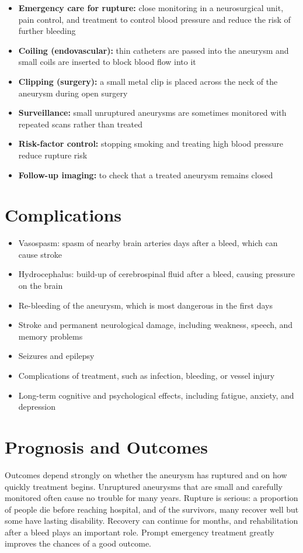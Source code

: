\begin{itemize}
    \item \textbf{Emergency care for rupture:} close monitoring in a neurosurgical unit, pain control, and treatment to control blood pressure and reduce the risk of further bleeding
    \item \textbf{Coiling (endovascular):} thin catheters are passed into the aneurysm and small coils are inserted to block blood flow into it
    \item \textbf{Clipping (surgery):} a small metal clip is placed across the neck of the aneurysm during open surgery
    \item \textbf{Surveillance:} small unruptured aneurysms are sometimes monitored with repeated scans rather than treated
    \item \textbf{Risk-factor control:} stopping smoking and treating high blood pressure reduce rupture risk
    \item \textbf{Follow-up imaging:} to check that a treated aneurysm remains closed
\end{itemize}

\section*{Complications}
\begin{itemize}
    \item Vasospasm: spasm of nearby brain arteries days after a bleed, which can cause stroke
    \item Hydrocephalus: build-up of cerebrospinal fluid after a bleed, causing pressure on the brain
    \item Re-bleeding of the aneurysm, which is most dangerous in the first days
    \item Stroke and permanent neurological damage, including weakness, speech, and memory problems
    \item Seizures and epilepsy
    \item Complications of treatment, such as infection, bleeding, or vessel injury
    \item Long-term cognitive and psychological effects, including fatigue, anxiety, and depression
\end{itemize}

\section*{Prognosis and Outcomes}
Outcomes depend strongly on whether the aneurysm has ruptured and on how quickly treatment begins. Unruptured aneurysms that are small and carefully monitored often cause no trouble for many years. Rupture is serious: a proportion of people die before reaching hospital, and of the survivors, many recover well but some have lasting disability. Recovery can continue for months, and rehabilitation after a bleed plays an important role. Prompt emergency treatment greatly improves the chances of a good outcome.


